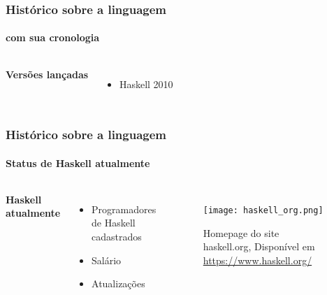 \documentclass[aspectratio=169]{beamer}
\begin{document}
    \begin{frame}

      \frametitle{Histórico sobre a linguagem}
      \framesubtitle{com sua cronologia}

      \begin{columns}
        \textbf{Versões lançadas} 

        \begin{itemize}
          \item Haskell 2010     
        \end{itemize}

      \end{columns}

    \end{frame}
    \begin{frame}
      
      \frametitle{Histórico sobre a linguagem}
      \framesubtitle{Status de Haskell atualmente}

      \begin{columns}
        \textbf{Haskell atualmente} 

        \begin{itemize}
          \item Programadores de Haskell cadastrados 
          \item Salário 
          \item Atualizações
        \end{itemize}


        \begin{figure}  
          \texttt{[image: haskell\_org.png]}
          \caption{\centering Homepage do site haskell.org, Disponível em \url{https://www.haskell.org/}}
        \end{figure} 

      \end{columns}

    \end{frame}

    \nocite{haskellmicrosoft}
    \nocite{haskellreport2010}
    \nocite{haskelljobs}
    \nocite{haskellers}

\end{document}
